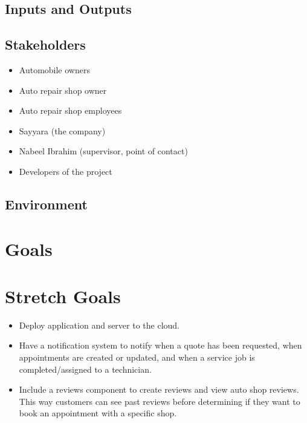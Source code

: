 \documentclass{article}
\begin{document}
\subsection{Inputs and Outputs}


\subsection{Stakeholders}
\begin{itemize}
\item Automobile owners
\item Auto repair shop owner
\item Auto repair shop employees
\item Sayyara (the company)
\item Nabeel Ibrahim (supervisor, point of contact)
\item Developers of the project
\end{itemize}

\subsection{Environment}


\section{Goals}

\section{Stretch Goals}
\begin{itemize}
\item Deploy application and server to the cloud.
\item Have a notification system to notify when a quote has been requested, when appointments are created or updated, and when a service job is completed/assigned to a technician.
\item Include a reviews component to create reviews and view auto shop reviews. This way customers can see past reviews before determining if they want to book an appointment with a specific shop.
\end{itemize}
\end{document}
